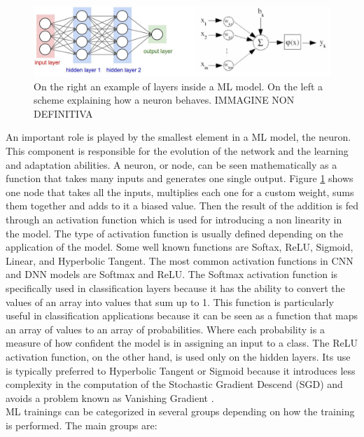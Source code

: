 \documentclass[12pt]{report}
\begin{document}
\begin{figure}[h!]
    \centering
    \includegraphics[width=140mm]{Figures/Chapter1/modelstructure.jpeg} 
    \caption{On the right an example of layers inside a ML model. On the left a scheme explaining how a neuron behaves. IMMAGINE NON DEFINITIVA}
    \label{fig:modelstructure}    
\end{figure}

An important role is played by the smallest element in a ML model, the neuron. This component is responsible for the evolution of the network and the learning and adaptation abilities. A neuron, or node, can be seen mathematically as a function that takes many inputs and generates one single output. Figure \ref{fig:modelstructure} shows one node that takes all the inputs, multiplies each one for a custom weight, sums them together and adds to it a biased value. Then the result of the addition is fed through an activation function which is used for introducing a non linearity in the model. The type of activation function is usually defined depending on the application of the model. Some well known functions are Softax, ReLU, Sigmoid, Linear, and Hyperbolic Tangent. 
The most common activation functions in CNN and DNN models are Softmax and ReLU. 
The Softmax activation function is specifically used in classification layers because it has the ability to convert the values of an array into values that sum up to 1. This function is particularly useful in classification applications because it can be seen as a function that maps an array of values to an array of probabilities. Where each probability is a measure of how confident the model is in assigning an input to a class. The ReLU activation function, on the other hand, is used only on the hidden layers. Its use is typically preferred to Hyperbolic Tangent or Sigmoid because it introduces less complexity in the computation of the Stochastic Gradient Descend (SGD) and avoids a problem known as Vanishing Gradient \autocite{ReLU_explanation}.\\
ML trainings can be categorized in several groups depending on how the training is performed. The main groups are:
\end{document}
